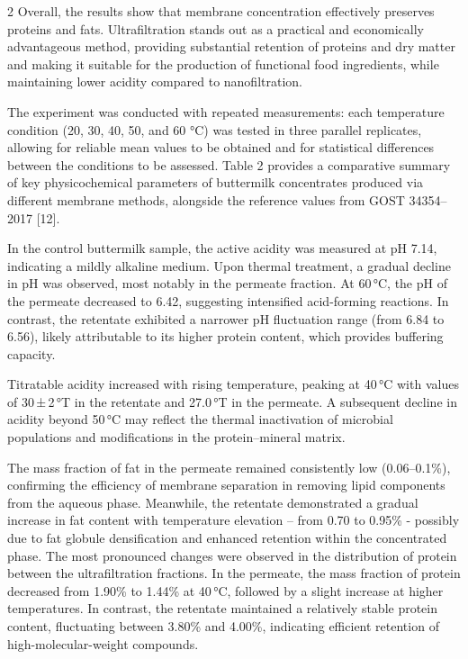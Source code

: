 \begin{multicols}{2}
Overall, the results show that membrane concentration effectively
preserves proteins and fats. Ultrafiltration stands out as a practical
and economically advantageous method, providing substantial retention of
proteins and dry matter and making it suitable for the production of
functional food ingredients, while maintaining lower acidity compared to
nanofiltration.

The experiment was conducted with repeated measurements: each
temperature condition (20, 30, 40, 50, and 60 °C) was tested in three
parallel replicates, allowing for reliable mean values to be obtained
and for statistical differences between the conditions to be assessed.
Table 2 provides a comparative summary of key physicochemical parameters
of buttermilk concentrates produced via different membrane methods,
alongside the reference values from GOST 34354--2017 {[}12{]}.

In the control buttermilk sample, the active acidity was measured at pH
7.14, indicating a mildly alkaline medium. Upon thermal treatment, a
gradual decline in pH was observed, most notably in the permeate
fraction. At 60\,°C, the pH of the permeate decreased to 6.42,
suggesting intensified acid-forming reactions. In contrast, the
retentate exhibited a narrower pH fluctuation range (from 6.84 to 6.56),
likely attributable to its higher protein content, which provides
buffering capacity.

Titratable acidity increased with rising temperature, peaking at 40\,°C
with values of 30\,±\,2\,°T in the retentate and 27.0\,°T in the
permeate. A subsequent decline in acidity beyond 50\,°C may reflect the
thermal inactivation of microbial populations and modifications in the
protein--mineral matrix.

The mass fraction of fat in the permeate remained consistently low
(0.06--0.1\%), confirming the efficiency of membrane separation in
removing lipid components from the aqueous phase. Meanwhile, the
retentate demonstrated a gradual increase in fat content with
temperature elevation -- from 0.70 to 0.95\% - possibly due to fat
globule densification and enhanced retention within the concentrated
phase. The most pronounced changes were observed in the distribution of
protein between the ultrafiltration fractions. In the permeate, the mass
fraction of protein decreased from 1.90\% to 1.44\% at 40\,°C, followed
by a slight increase at higher temperatures. In contrast, the retentate
maintained a relatively stable protein content, fluctuating between
3.80\% and 4.00\%, indicating efficient retention of
high-molecular-weight compounds.


\end{multicols}
